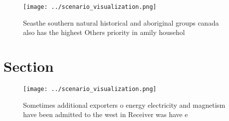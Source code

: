 \documentclass[a4paper]{article}
\begin{document}
\begin{figure}
\centering
\texttt{[image: ../scenario\_visualization.png]}
\caption{Seasthe southern natural historical and aboriginal groups canada also has the highest Others priority in amily househol
}
\end{figure}
 
\section{Section}

\begin{figure}
\centering
\texttt{[image: ../scenario\_visualization.png]}
\caption{Sometimes additional exporters o energy electricity and magnetism have been admitted to the west in Receiver was have e
}
\end{figure}
 
\end{document}
